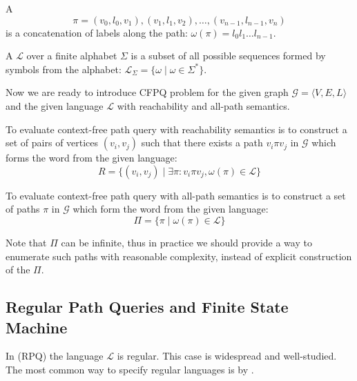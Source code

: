 \begin{definition}
A  $$\pi = (v_0,l_0,v_1),(v_1,l_1,v_2),\ldots,(v_{n-1},l_{n-1},v_n)$$ is a concatenation of labels along the path: $\omega(\pi) = l_0 l_1 \ldots l_{n-1}$.
\end{definition}


\begin{definition}
A  $\mathcal{L}$ over a finite alphabet $\Sigma$ is a subset of all possible sequences formed by symbols from the alphabet: $\mathcal{L}_{\Sigma} = \{\omega \mid \omega \in \Sigma^*\}$.
\end{definition}

Now we are ready to introduce CFPQ problem for the given graph  $\mathcal{G} = \langle V,E,L \rangle$ and the given language $\mathcal{L}$ with reachability and all-path semantics.

\begin{definition}
To evaluate context-free path query with reachability semantics is to construct a set of pairs of vertices $(v_i,v_j)$ such that there exists a path $v_i \pi v_j$ in $\mathcal{G}$ which forms the word from the given language:
$$
R = \{(v_i,v_j) \mid \exists \pi: v_i \pi v_j, \omega(\pi) \in \mathcal{L} \}
$$
\end{definition}

\begin{definition}
To evaluate context-free path query with all-path semantics is to construct a set of paths $\pi$ in $\mathcal{G}$ which form the word from the given language:
$$
\Pi = \{ \pi \mid \omega(\pi) \in \mathcal{L}\}
$$
\end{definition}

Note that $\Pi$ can be infinite, thus in practice we should provide a way to enumerate such paths with reasonable complexity, instead of explicit construction of the $\Pi$.

\subsection{Regular Path Queries and Finite State Machine}

In  (RPQ) the language $\mathcal{L}$ is regular.
This case is widespread and well-studied.
The most common way to specify regular languages is by .

